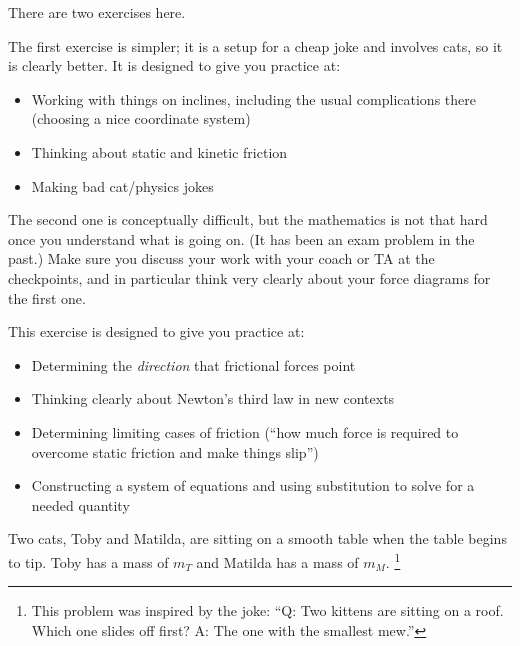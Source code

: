 \documentclass[12pt]{article}
\begin{document}
		\Large
		\centerline{}
		\normalsize
		\centerline{}
		
		
There are two exercises here.


\vspace{1cm}


The first exercise is simpler; it is a setup for a cheap joke and involves cats, so it is clearly better. It is designed to give you practice at:

\begin{itemize}
	\item Working with things on inclines, including the usual complications there (choosing a nice coordinate system)
	\item Thinking about static and kinetic friction
	\item Making bad cat/physics jokes
	
\end{itemize}

\vspace{3cm}

The second one is conceptually difficult, but the mathematics is not that hard once you understand what is going on. (It has been an exam problem in the past.) Make sure you discuss your work with your coach or TA at the checkpoints, and in particular think very clearly about your force diagrams for the first one.

This exercise is designed to give you practice at:

\begin{itemize}
	\item Determining the {\it direction} that frictional forces point
	\item Thinking clearly about Newton's third law in new contexts
	\item Determining limiting cases of friction (``how much force is required to overcome static friction and make things slip'')
	\item Constructing a system of equations and using substitution to solve for a needed quantity
\end{itemize}

		\newpage

Two cats, Toby and Matilda, are sitting on a smooth table when the table begins to tip. Toby has a mass of $m_T$ and Matilda has a mass of $m_M$. \footnote{This problem was inspired by the joke: ``Q: Two kittens are sitting on a roof. Which one slides off first? A: The one with the smallest mew.''}
\end{document}
